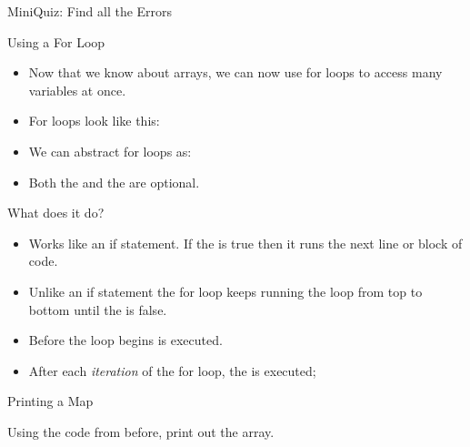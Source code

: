 \begin{frame}[fragile]{MiniQuiz: Find all the Errors}
\begin{semiverbatim}\end{semiverbatim}
\end{frame}

\begin{frame}{Using a For Loop}
\begin{itemize}
\item Now that we know about arrays, we can now use for loops to access many variables at once.
\item For loops look like this:
\begin{center}\texttt{}\end{center} \pause
\item We can abstract for loops as:
\begin{center}\texttt{}\end{center} \pause
\item Both the \texttt{} and the \texttt{} are optional.
\end{itemize}
\end{frame}


\begin{frame}{What does it do?}
\begin{itemize}
\item Works like an if statement. If the \texttt{} is true then it runs the next line or block of code. \pause
\item Unlike an if statement the for loop keeps running the loop from top to bottom until the \texttt{} is false. \pause
\item Before the loop begins \texttt{} is executed. \pause
\item After each \emph{iteration} of the for loop, the \texttt{} is executed;
\end{itemize}
\end{frame}


\begin{frame}[fragile]{Printing a Map}
\begin{center}Using the code from before, print out the array.\end{center}
\begin{semiverbatim}\end{semiverbatim}
\end{frame}


